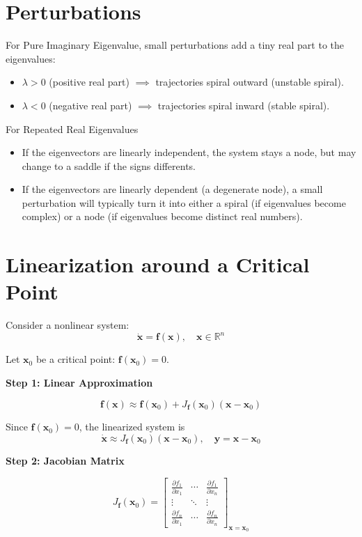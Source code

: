 \documentclass{report}
\begin{document}
\section*{Perturbations}

For Pure Imaginary Eigenvalue,  
small perturbations add a tiny real part to the eigenvalues:

\begin{itemize}
    \item $\lambda > 0$ (positive real part) $\implies$ trajectories spiral outward (unstable spiral).
    \item $\lambda < 0$ (negative real part) $\implies$ trajectories spiral inward (stable spiral).
\end{itemize}

For Repeated Real Eigenvalues

\begin{itemize}
    \item If the eigenvectors are linearly independent, the system stays a node, but may change to a saddle if the signs differents.
    \item If the eigenvectors are linearly dependent (a degenerate node), 
    a small perturbation will typically turn it into either a spiral 
    (if eigenvalues become complex) or a node 
    (if eigenvalues become distinct real numbers).
\end{itemize}

\section*{Linearization around a Critical Point}

Consider a nonlinear system:
\[
\dot{\mathbf{x}} = \mathbf{f}(\mathbf{x}), \quad \mathbf{x} \in \mathbb{R}^n
\]

Let $\mathbf{x}_0$ be a critical point: $\mathbf{f}(\mathbf{x}_0) = 0$.

\textbf{Step 1: Linear Approximation}

\[
\mathbf{f}(\mathbf{x}) \approx \mathbf{f}(\mathbf{x}_0) + J_{\mathbf{f}}(\mathbf{x}_0)(\mathbf{x} - \mathbf{x}_0)
\]

Since $\mathbf{f}(\mathbf{x}_0) = 0$, the linearized system is
\[
\dot{\mathbf{x}} \approx J_{\mathbf{f}}(\mathbf{x}_0) (\mathbf{x} - \mathbf{x}_0), \quad
\mathbf{y} = \mathbf{x} - \mathbf{x}_0
\]

\textbf{Step 2: Jacobian Matrix}

\[
J_{\mathbf{f}}(\mathbf{x}_0) =
\begin{bmatrix}
\frac{\partial f_1}{\partial x_1} & \cdots & \frac{\partial f_1}{\partial x_n} \\
\vdots & \ddots & \vdots \\
\frac{\partial f_n}{\partial x_1} & \cdots & \frac{\partial f_n}{\partial x_n} 
\end{bmatrix}_{\mathbf{x} = \mathbf{x}_0}
\]
\end{document}
